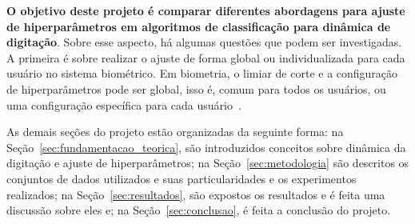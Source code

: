 \textbf{O objetivo deste projeto é comparar diferentes abordagens para ajuste de hiperparâmetros em algoritmos de classificação para dinâmica de digitação}. Sobre esse aspecto, há algumas questões que podem ser investigadas. A primeira é sobre realizar o ajuste de forma global ou individualizada para cada usuário no sistema biométrico. Em biometria, o limiar de corte e a configuração de hiperparâmetros pode ser global, isso é, comum para todos os usuários, ou uma configuração específica para cada usuário~\cite{Giot2011Unconstrained, Mhenni2019DoubleSerial}.

As demais seções do projeto estão organizadas da seguinte forma: na Seção~\ref{sec:fundamentacao_teorica}, são introduzidos conceitos sobre dinâmica da digitação e ajuste de hiperparâmetros; na Seção~\ref{sec:metodologia} são descritos os conjuntos de dados utilizados e suas particularidades e os experimentos realizados; na Seção~\ref{sec:resultados}, são expostos os resultados e é feita uma discussão sobre eles e; na Seção~\ref{sec:conclusao}, é feita a conclusão do projeto.

